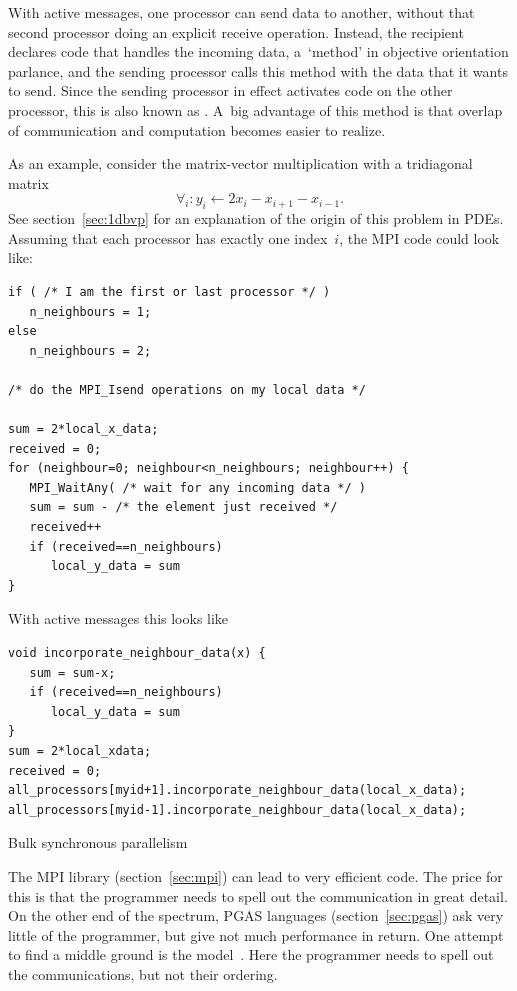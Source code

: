 With active messages, one processor can send data to another, without
that second processor doing an explicit receive operation. Instead,
the recipient declares code that handles the incoming data, a~`method'
in objective orientation parlance, and the sending processor calls
this method with the data that it wants to send. Since the sending
processor in effect activates code on the other processor, this is
also known as . A~big advantage of
this method is that overlap of communication and computation becomes
easier to realize.

As an example, consider the matrix-vector multiplication with a
tridiagonal matrix
\[ \forall_i\colon y_i\leftarrow 2x_i-x_{i+1}-x_{i-1}. \]
See section~\ref{sec:1dbvp} for an explanation of the origin of this
problem in \acp{PDE}. Assuming that each processor has exactly one
index~$i$, the MPI code could look like:
\begin{verbatim}
if ( /* I am the first or last processor */ )
   n_neighbours = 1;
else
   n_neighbours = 2;

/* do the MPI_Isend operations on my local data */

sum = 2*local_x_data;
received = 0;
for (neighbour=0; neighbour<n_neighbours; neighbour++) {
   MPI_WaitAny( /* wait for any incoming data */ )
   sum = sum - /* the element just received */
   received++
   if (received==n_neighbours)
      local_y_data = sum
}
\end{verbatim}
With active messages this looks like
\begin{verbatim}
void incorporate_neighbour_data(x) {
   sum = sum-x;
   if (received==n_neighbours)
      local_y_data = sum
}
sum = 2*local_xdata;
received = 0;
all_processors[myid+1].incorporate_neighbour_data(local_x_data);
all_processors[myid-1].incorporate_neighbour_data(local_x_data);
\end{verbatim}

 {Bulk synchronous parallelism}
\label{sec:bsp}

The MPI library (section~\ref{sec:mpi}) can lead to very efficient
code. The price for this is that the programmer needs to spell out the
communication in great detail. On the other end of the spectrum, PGAS
languages (section~\ref{sec:pgas}) ask very little of the programmer,
but give not much performance in return. One attempt to find a middle
ground is the 
model~\cite{Valiant:1990:BSP,Skillicorn96questionsand}. Here the
programmer needs to spell out the communications, but not their
ordering.

